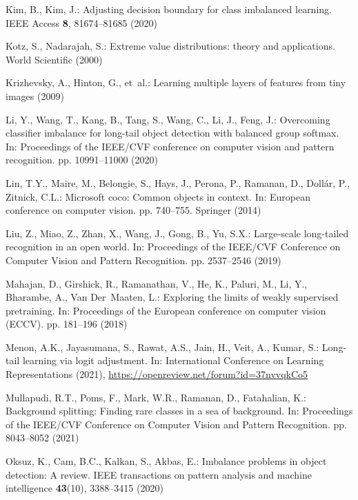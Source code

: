 \documentclass[runningheads]{llncs}
\begin{document}
\begin{thebibliography}{10}
Kim, B., Kim, J.: Adjusting decision boundary for class imbalanced learning.
  IEEE Access  \textbf{8},  81674--81685 (2020)

Kotz, S., Nadarajah, S.: Extreme value distributions: theory and applications.
  World Scientific (2000)

Krizhevsky, A., Hinton, G., et~al.: Learning multiple layers of features from
  tiny images  (2009)

Li, Y., Wang, T., Kang, B., Tang, S., Wang, C., Li, J., Feng, J.: Overcoming
  classifier imbalance for long-tail object detection with balanced group
  softmax. In: Proceedings of the IEEE/CVF conference on computer vision and
  pattern recognition. pp. 10991--11000 (2020)

Lin, T.Y., Maire, M., Belongie, S., Hays, J., Perona, P., Ramanan, D.,
  Doll{\'a}r, P., Zitnick, C.L.: Microsoft coco: Common objects in context. In:
  European conference on computer vision. pp. 740--755. Springer (2014)

Liu, Z., Miao, Z., Zhan, X., Wang, J., Gong, B., Yu, S.X.: Large-scale
  long-tailed recognition in an open world. In: Proceedings of the IEEE/CVF
  Conference on Computer Vision and Pattern Recognition. pp. 2537--2546 (2019)

Mahajan, D., Girshick, R., Ramanathan, V., He, K., Paluri, M., Li, Y.,
  Bharambe, A., Van Der~Maaten, L.: Exploring the limits of weakly supervised
  pretraining. In: Proceedings of the European conference on computer vision
  (ECCV). pp. 181--196 (2018)

Menon, A.K., Jayasumana, S., Rawat, A.S., Jain, H., Veit, A., Kumar, S.:
  Long-tail learning via logit adjustment. In: International Conference on
  Learning Representations (2021),
  \url{https://openreview.net/forum?id=37nvvqkCo5}

Mullapudi, R.T., Poms, F., Mark, W.R., Ramanan, D., Fatahalian, K.: Background
  splitting: Finding rare classes in a sea of background. In: Proceedings of
  the IEEE/CVF Conference on Computer Vision and Pattern Recognition. pp.
  8043--8052 (2021)

Oksuz, K., Cam, B.C., Kalkan, S., Akbas, E.: Imbalance problems in object
  detection: A review. IEEE transactions on pattern analysis and machine
  intelligence  \textbf{43}(10),  3388--3415 (2020)


\end{thebibliography}
\end{document}
